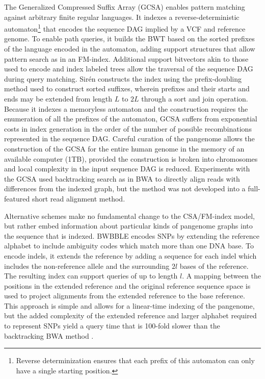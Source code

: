 The Generalized Compressed Suffix Array (GCSA) \cite{siren2011indexing,siren2014indexing} enables pattern matching against arbitrary finite regular languages.
It indexes a reverse-deterministic automaton\footnote{Reverse determinization ensures that each prefix of this automaton can only have a single starting position.} that encodes the sequence DAG implied by a VCF and reference genome.
To enable path queries, it builds the BWT based on the sorted prefixes of the language encoded in the automaton, adding support structures that allow pattern search as in an FM-index.
Additional support bitvectors akin to those used to encode and index labeled trees \cite{ferragina2005structuring} allow the traversal of the sequence DAG during query matching.
Sir\'{e}n constructs the index using the prefix-doubling method used to construct sorted suffixes, wherein prefixes and their starts and ends may be extended from length $L$ to $2L$ through a sort and join operation.
Because it indexes a memoryless automaton and the construction requires the enumeration of all the prefixes of the automaton, GCSA suffers from exponential costs in index generation in the order of the number of possible recombinations represented in the sequence DAG.
Careful curation of the pangenome allows the construction of the GCSA for the entire human genome in the memory of an available computer (1TB), provided the construction is broken into chromosomes and local complexity in the input sequence DAG is reduced.
Experiments with the GCSA used backtracking search as in BWA \cite{li2009fast} to directly align reads with differences from the indexed graph, but the method was not developed into a full-featured short read alignment method.

Alternative schemes make no fundamental change to the CSA/FM-index model, but rather embed information about particular kinds of pangenome graphs into the sequence that is indexed.
BWBBLE \cite{huang2013short} encodes SNPs by extending the reference alphabet to include ambiguity codes which match more than one DNA base.
To encode indels, it extends the reference by adding a sequence for each indel which includes the non-reference allele and the surrounding $2l$ bases of the reference.
The resulting index can support queries of up to length $l$.
A mapping between the positions in the extended reference and the original reference sequence space is used to project alignments from the extended reference to the base reference.
This approach is simple and allows for a linear-time indexing of the pangenome, but the added complexity of the extended reference and larger alphabet required to represent SNPs yield a query time that is 100-fold slower than the backtracking BWA method \cite{huang2013short}.

